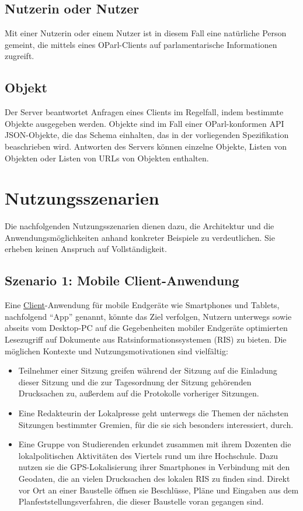 \documentclass[,a4paper]{article}
\begin{document}
\subsection{Nutzerin oder Nutzer}\label{nutzerin}

Mit einer Nutzerin oder einem Nutzer ist in diesem Fall eine natürliche
Person gemeint, die mittels eines OParl-Clients auf parlamentarische
Informationen zugreift.

\subsection{Objekt}\label{objekt}

Der Server beantwortet Anfragen eines Clients im Regelfall, indem
bestimmte Objekte ausgegeben werden. Objekte sind im Fall einer
OParl-konformen API JSON-Objekte, die das Schema einhalten, das in der
vorliegenden Spezifikation beaschrieben wird. Antworten des Servers
können einzelne Objekte, Listen von Objekten oder Listen von URLs von
Objekten enthalten.

\section{Nutzungsszenarien}\label{nutzungsszenarien}

Die nachfolgenden Nutzungsszenarien dienen dazu, die Architektur und die
Anwendungsmöglichkeiten anhand konkreter Beispiele zu verdeutlichen. Sie
erheben keinen Anspruch auf Vollständigkeit.

\subsection{Szenario 1: Mobile
Client-Anwendung}\label{szenarioux5fmobileux5fclient}

Eine \hyperref[client]{Client}-Anwendung für mobile Endgeräte wie
Smartphones und Tablets, nachfolgend ``App'' genannt, könnte das Ziel
verfolgen, Nutzern unterwegs sowie abseits vom Desktop-PC auf die
Gegebenheiten mobiler Endgeräte optimierten Lesezugriff auf Dokumente
aus Ratsinformationssystemen (RIS) zu bieten. Die möglichen Kontexte und
Nutzungsmotivationen sind vielfältig:

\begin{itemize}
\item
  Teilnehmer einer Sitzung greifen während der Sitzung auf die Einladung
  dieser Sitzung und die zur Tagesordnung der Sitzung gehörenden
  Drucksachen zu, außerdem auf die Protokolle vorheriger Sitzungen.
\item
  Eine Redakteurin der Lokalpresse geht unterwegs die Themen der
  nächsten Sitzungen bestimmter Gremien, für die sie sich besonders
  interessiert, durch.
\item
  Eine Gruppe von Studierenden erkundet zusammen mit ihrem Dozenten die
  lokalpolitischen Aktivitäten des Viertels rund um ihre Hochschule.
  Dazu nutzen sie die GPS-Lokalisierung ihrer Smartphones in Verbindung
  mit den Geodaten, die an vielen Drucksachen des lokalen RIS zu finden
  sind. Direkt vor Ort an einer Baustelle öffnen sie Beschlüsse, Pläne
  und Eingaben aus dem Planfeststellungsverfahren, die dieser Baustelle
  voran gegangen sind.
\end{itemize}
\end{document}
